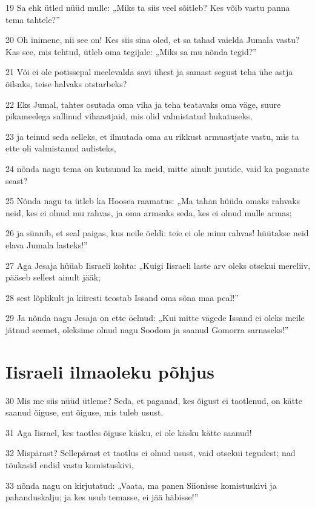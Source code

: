 \par 19 Sa ehk ütled nüüd mulle: „Miks ta siis veel sõitleb? Kes võib vastu panna tema tahtele?”
\par 20 Oh inimene, nii see on! Kes siis sina oled, et sa tahad vaielda Jumala vastu? Kas see, mis tehtud, ütleb oma tegijale: „Miks sa mu nõnda tegid?”
\par 21 Või ei ole potissepal meelevalda savi ühest ja samast segust teha ühe astja õilsaks, teise halvaks otstarbeks?
\par 22 Eks Jumal, tahtes osutada oma viha ja teha teatavaks oma väge, suure pikameelega sallinud vihaastjaid, mis olid valmistatud hukatuseks,
\par 23 ja teinud seda selleks, et ilmutada oma au rikkust armuastjate vastu, mis ta ette oli valmistanud aulisteks,
\par 24 nõnda nagu tema on kutsunud ka meid, mitte ainult juutide, vaid ka paganate seast?
\par 25 Nõnda nagu ta ütleb ka Hoosea raamatus: „Ma tahan hüüda omaks rahvaks neid, kes ei olnud mu rahvas, ja oma armsaks seda, kes ei olnud mulle armas;
\par 26 ja sünnib, et seal paigas, kus neile öeldi: teie ei ole minu rahvas! hüütakse neid elava Jumala lasteks!”
\par 27 Aga Jesaja hüüab Iisraeli kohta: „Kuigi Iisraeli laste arv oleks otsekui mereliiv, pääseb sellest ainult jääk;
\par 28 sest lõplikult ja kiiresti teostab Issand oma sõna maa peal!”
\par 29 Ja nõnda nagu Jesaja on ette öelnud: „Kui mitte vägede Issand ei oleks meile jätnud seemet, oleksime olnud nagu Soodom ja saanud Gomorra sarnaseks!”

\section*{Iisraeli ilmaoleku põhjus}

\par 30 Mis me siis nüüd ütleme? Seda, et paganad, kes õigust ei taotlenud, on kätte saanud õiguse, ent õiguse, mis tuleb usust.
\par 31 Aga Iisrael, kes taotles õiguse käsku, ei ole käsku kätte saanud!
\par 32 Mispärast? Sellepärast et taotlus ei olnud usust, vaid otsekui tegudest; nad tõukasid endid vastu komistuskivi,
\par 33 nõnda nagu on kirjutatud: „Vaata, ma panen Siionisse komistuskivi ja pahanduskalju; ja kes usub temasse, ei jää häbisse!”



